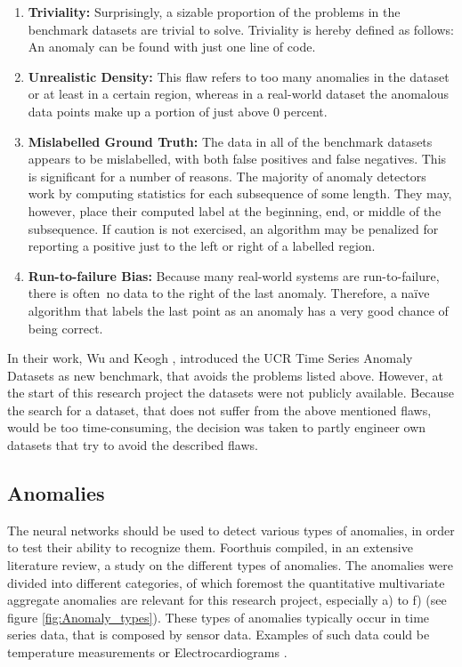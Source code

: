 \begin{enumerate}
	\item \textbf{Triviality:} Surprisingly, a sizable proportion of the problems in the benchmark datasets are trivial to solve. Triviality is hereby defined as follows: An anomaly can be found with just one line of code.
	\item \textbf{Unrealistic Density:} This flaw refers to too many anomalies in the dataset or at least in a certain region, whereas in a real-world dataset the anomalous data points make up a portion of just above 0 percent.   
	\item \textbf{Mislabelled Ground Truth:} The data in all of the benchmark datasets appears to be mislabelled, with both false positives and false negatives. This is significant for a number of reasons. The majority of anomaly detectors work by computing statistics for each subsequence of some length. They may, however, place their computed label at the beginning, end, or middle of the subsequence. If caution is not exercised, an algorithm may be penalized for reporting a positive just to the left or right of a labelled region.
	\item \textbf{Run-to-failure Bias:} Because many real-world systems are run-to-failure, there is often no data to the right of the last anomaly. Therefore, a naïve algorithm that labels the last point as an anomaly has a very good chance of being correct.
\end{enumerate}

In their work, Wu and Keogh \parencite*{Wu2020}, introduced the UCR Time Series Anomaly Datasets as new benchmark, that avoids the problems listed above. However, at the start of this research project the datasets were not publicly available. Because the search for a dataset, that does not suffer from the above mentioned flaws, would be too time-consuming, the decision was taken to partly engineer own datasets that try to avoid the described flaws.
\newline
\subsection{Anomalies}
The neural networks should be used to detect various types of anomalies, in order to test their ability to recognize them. Foorthuis \parencite*{Foorthuis2021} compiled, in an extensive literature review, a study on the different types of anomalies. The anomalies were divided into different categories, of which foremost the quantitative multivariate aggregate anomalies are relevant for this research project, especially a) to f) (see figure \ref{fig:Anomaly_types}). These types of anomalies typically occur in time series data, that is composed by sensor data. Examples of such data could be temperature measurements or Electrocardiograms \parencite{Malhotra2015}.

